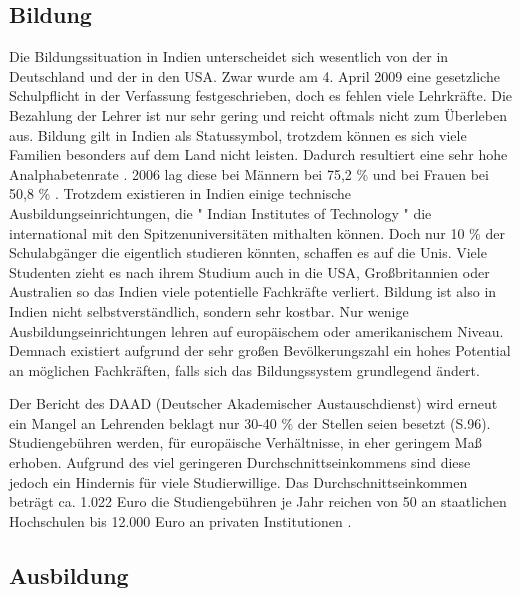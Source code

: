 \subsection{Bildung}
Die Bildungssituation in Indien unterscheidet sich wesentlich von der in Deutschland und der in den USA. Zwar wurde am 4. April 2009 eine gesetzliche Schulpflicht in der Verfassung festgeschrieben, doch es fehlen viele Lehrkräfte. \cite{dw} Die Bezahlung der Lehrer ist nur sehr gering und reicht oftmals nicht zum Überleben aus. Bildung gilt in Indien als Statussymbol, trotzdem können es sich viele Familien besonders auf dem Land nicht leisten. Dadurch resultiert eine sehr hohe Analphabetenrate \cite{analpha}. 2006 lag diese bei Männern bei 75,2 \% und bei Frauen bei 50,8 \% .
Trotzdem existieren in Indien einige technische Ausbildungseinrichtungen, die " Indian Institutes of Technology " die international mit den Spitzenuniversitäten mithalten können. Doch nur 10 \% der Schulabgänger die eigentlich studieren könnten, schaffen es auf die Unis. Viele Studenten zieht es nach ihrem Studium auch in die USA, Großbritannien oder Australien so das Indien viele potentielle Fachkräfte verliert.
Bildung ist also in Indien nicht selbstverständlich, sondern sehr kostbar. Nur wenige Ausbildungseinrichtungen lehren auf europäischem oder amerikanischem Niveau. Demnach existiert aufgrund der sehr großen Bevölkerungszahl ein hohes Potential an möglichen Fachkräften, falls sich das Bildungssystem grundlegend ändert.

Der Bericht des DAAD (Deutscher Akademischer Austauschdienst) \cite{daad} wird erneut ein Mangel an Lehrenden beklagt nur 30-40 \% der Stellen seien besetzt (S.96).
Studiengebühren werden, für europäische Verhältnisse, in eher geringem Maß erhoben. Aufgrund des viel geringeren Durchschnittseinkommens sind diese jedoch ein Hindernis für viele Studierwillige. Das Durchschnittseinkommen beträgt ca. 1.022 Euro \cite{ausa} die Studiengebühren je Jahr reichen von 50 an staatlichen Hochschulen bis 12.000 Euro an privaten Institutionen \cite[101]{daad}.


\subsection{Ausbildung}








